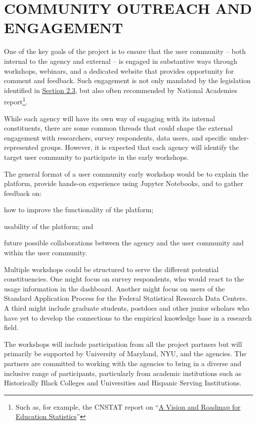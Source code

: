 \documentclass[titlepage, 11pt]{article}
\begin{document}
{\section{COMMUNITY OUTREACH AND ENGAGEMENT}
\label{sec:Chapter11}
One of the key goals of the project is to ensure that the user community – both internal to the agency and external – is engaged in substantive ways through workshops, webinars, and a dedicated website that provides opportunity for comment and feedback. Such engagement is not only mandated by the legislation identified in \hyperref[sec:Response to Legislative Mandate and Committee Recommendations]{Section 2.3}, but also often recommended by National Academies report\footnote{Such as, for example, the CNSTAT report on “\href{https://www.nationalacademies.org/our-work/a-vision-and-roadmap-for-education-statistics-in-2030-and-beyond}{A Vision and Roadmap for Education Statistics}” }.

While each agency will have its own way of engaging with its internal constituents, there are some common threads that could shape the external engagement with researchers, survey respondents, data users, and specific under-represented groups. However, it is expected that each agency will identify the target user community to participate in the early workshops. 

The general format of a user community early workshop would be to explain the platform, provide hands-on experience using Jupyter Notebooks, and to gather feedback on: \begin{enumerate*}
    \item how to improve the functionality of the platform;
    \item usability of the platform; and
    \item future possible collaborations between the agency and the user community and within the user community.
\end{enumerate*}

Multiple workshops could be structured to serve the different potential constituencies. One might focus on survey respondents, who would react to the usage information in the dashboard. Another might focus on users of the Standard Application Process for the Federal Statistical Research Data Centers. A third might include graduate students, postdocs and other junior scholars who have yet to develop the connections to the empirical knowledge base in a research field. 

The workshops will include participation from all the project partners but will primarily be supported by University of Maryland, NYU, and the agencies. The partners are committed to working with the agencies to bring in a diverse and inclusive range of participants, particularly from academic institutions such as Historically Black Colleges and Universities and Hispanic Serving Institutions.

}
\end{document}
